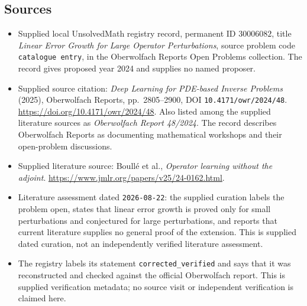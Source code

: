 \documentclass[11pt]{article}
\begin{document}
\subsection{Sources}
\begin{itemize}
\item Supplied local UnsolvedMath registry record, permanent ID \(30006082\), title \emph{Linear Error Growth for Large Operator Perturbations}, source problem code \texttt{catalogue entry}, in the Oberwolfach Reports Open Problems collection. The record gives proposed year 2024 and supplies no named proposer.
\item Supplied source citation: \emph{Deep Learning for PDE-based Inverse Problems} (2025), Oberwolfach Reports, pp.\ 2805--2900, DOI \texttt{10.4171/owr/2024/48}. \url{https://doi.org/10.4171/owr/2024/48}. Also listed among the supplied literature sources as \emph{Oberwolfach Report 48/2024}. The record describes Oberwolfach Reports as documenting mathematical workshops and their open-problem discussions.
\item Supplied literature source: Boullé et al., \emph{Operator learning without the adjoint}. \url{https://www.jmlr.org/papers/v25/24-0162.html}.
\item Literature assessment dated \texttt{2026-08-22}: the supplied curation labels the problem open, states that linear error growth is proved only for small perturbations and conjectured for large perturbations, and reports that current literature supplies no general proof of the extension. This is supplied dated curation, not an independently verified literature assessment.
\item The registry labels its statement \texttt{corrected\_verified} and says that it was reconstructed and checked against the official Oberwolfach report. This is supplied verification metadata; no source visit or independent verification is claimed here.
\end{itemize}
\end{document}
